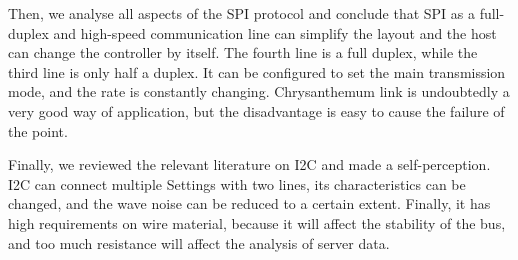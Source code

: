 \documentclass[12pt,a4paper]{article}
\numberwithin{equation}{section}
\begin{document}
Then, we analyse all aspects of the SPI protocol and conclude that SPI
as a full-duplex and high-speed communication line can simplify the
layout and the host can change the controller by itself. The fourth line
is a full duplex, while the third line is only half a duplex. It can be
configured to set the main transmission mode, and the rate is constantly
changing. Chrysanthemum link is undoubtedly a very good way of
application, but the disadvantage is easy to cause the failure of the
point.

Finally, we reviewed the relevant literature on I2C and made a
self-perception. I2C can connect multiple Settings with two lines, its
characteristics can be changed, and the wave noise can be reduced to a
certain extent. Finally, it has high requirements on wire material,
because it will affect the stability of the bus, and too much resistance
will affect the analysis of server data.
\end{document}

